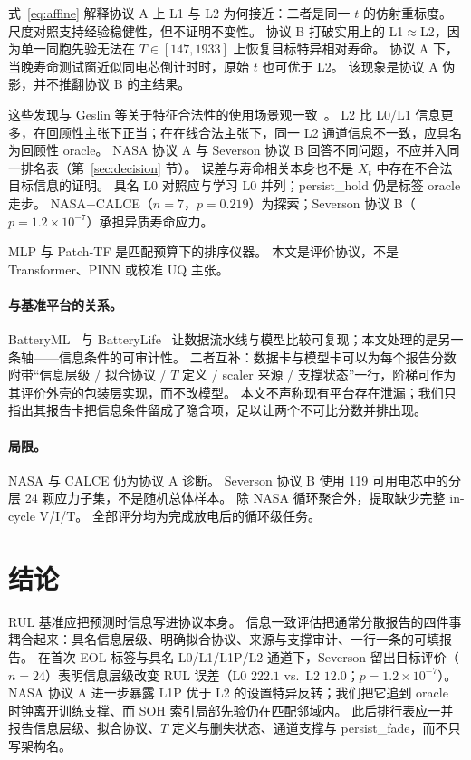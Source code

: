 \documentclass[UTF8,a4paper,12pt]{ctexart}
\begin{document}
式~\eqref{eq:affine} 解释协议 A 上 L1 与 L2 为何接近：二者是同一 $t$ 的仿射重标度。
尺度对照支持经验稳健性，但不证明不变性。
协议 B 打破实用上的 L1$\approx$L2，因为单一同胞先验无法在 $T\in[147,1933]$ 上恢复目标特异相对寿命。
协议 A 下，当晚寿命测试窗近似同电芯倒计时时，原始 $t$ 也可优于 L2。
该现象是协议 A 伪影，并不推翻协议 B 的主结果。

这些发现与 Geslin 等关于特征合法性的使用场景观一致~\cite{geslin2023joule,kaufman2012leakage}。
L2 比 L0/L1 信息更多，在回顾性主张下正当；在在线合法主张下，同一 L2 通道信息不一致，应具名为回顾性 oracle。
NASA 协议 A 与 Severson 协议 B 回答不同问题，不应并入同一排名表（第~\ref{sec:decision} 节）。
误差与寿命相关本身也不是 $X_t$ 中存在不合法目标信息的证明。
具名 L0 对照应与学习 L0 并列；persist\_hold 仍是标签 oracle 走步。
NASA+CALCE（$n{=}7$，$p=0.219$）为探索；Severson 协议 B（$p=1.2{\times}10^{-7}$）承担异质寿命应力。

MLP 与 Patch-TF 是匹配预算下的排序仪器。
本文是评价协议，不是 Transformer、PINN 或校准 UQ 主张。

\paragraph{与基准平台的关系。}
BatteryML~\cite{zhang2024batteryml} 与 BatteryLife~\cite{tan2025batterylife} 让数据流水线与模型比较可复现；本文处理的是另一条轴——信息条件的可审计性。
二者互补：数据卡与模型卡可以为每个报告分数附带“信息层级 / 拟合协议 / $T$ 定义 / scaler 来源 / 支撑状态”一行，阶梯可作为其评价外壳的包装层实现，而不改模型。
本文不声称现有平台存在泄漏；我们只指出其报告卡把信息条件留成了隐含项，足以让两个不可比分数并排出现。

\paragraph{局限。}
NASA 与 CALCE 仍为协议 A 诊断。
Severson 协议 B 使用 119 可用电芯中的分层 24 颗应力子集，不是随机总体样本。
除 NASA 循环聚合外，提取缺少完整 in-cycle V/I/T。
全部评分均为完成放电后的循环级任务。

\section{结论}
\label{sec:conclusion}

RUL 基准应把预测时信息写进协议本身。
信息一致评估把通常分散报告的四件事耦合起来：具名信息层级、明确拟合协议、来源与支撑审计、一行一条的可填报告。
在首次 EOL 标签与具名 L0/L1/L1P/L2 通道下，Severson 留出目标评价（$n{=}24$）表明信息层级改变 RUL 误差（L0 $222.1$ vs.\ L2 $12.0$；$p=1.2{\times}10^{-7}$）。
NASA 协议 A 进一步暴露 L1P 优于 L2 的设置特异反转；我们把它追到 oracle 时钟离开训练支撑、而 SOH 索引局部先验仍在匹配邻域内。
此后排行表应一并报告信息层级、拟合协议、$T$ 定义与删失状态、通道支撑与 persist\_fade，而不只写架构名。
\end{document}
